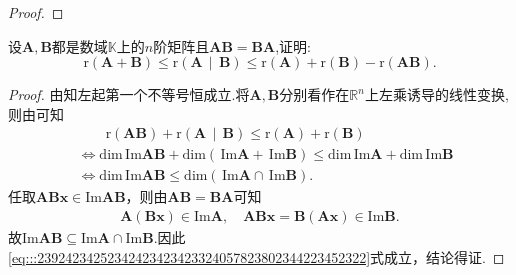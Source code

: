 \documentclass[../../main.tex]{subfiles}%
\begin{document}
\begin{proof}
\end{proof}

\begin{proposition}\label{proposition:矩阵乘法可交换诱导的秩不等式}
设\(\boldsymbol{A},\boldsymbol{B}\)都是数域\(\mathbb{K}\)上的\(n\)阶矩阵且\(\boldsymbol{A}\boldsymbol{B}=\boldsymbol{B}\boldsymbol{A}\),证明:
\[
\mathrm{r}\left( \boldsymbol{A}+\boldsymbol{B} \right) \leqslant \mathrm{r}\left( \boldsymbol{A}\,\mid \,\boldsymbol{B} \right) \leqslant \mathrm{r}\left( \boldsymbol{A} \right) +\mathrm{r}\left( \boldsymbol{B} \right) -\mathrm{r}\left( \boldsymbol{AB} \right) .
\]
\end{proposition}
\begin{proof}

由知左起第一个不等号恒成立.将$\boldsymbol{A},\boldsymbol{B}$分别看作在$\mathbb{R} ^n$上左乘诱导的线性变换,则由可知
\begin{align}
&\quad \quad \mathrm{r}\left( \boldsymbol{AB} \right) +\mathrm{r}\left( \boldsymbol{A}\,\mid \,\boldsymbol{B} \right) \leqslant \mathrm{r}\left( \boldsymbol{A} \right) +\mathrm{r}\left( \boldsymbol{B} \right) 
\nonumber \\
&\Longleftrightarrow \mathrm{dim}\,\mathrm{Im}\boldsymbol{AB}+\mathrm{dim}\left( \,\mathrm{Im}\boldsymbol{A}+\,\mathrm{Im}\boldsymbol{B} \right) \leqslant \mathrm{dim}\,\mathrm{Im}\boldsymbol{A}+\mathrm{dim}\,\mathrm{Im}\boldsymbol{B}
\nonumber \\
&\Longleftrightarrow \mathrm{dim}\,\mathrm{Im}\boldsymbol{AB}\leqslant \mathrm{dim}\left( \,\mathrm{Im}\boldsymbol{A}\cap \,\mathrm{Im}\boldsymbol{B} \right) .\label{eq:::23924234252342423423423324057823802344223452322}
\end{align}
任取$\boldsymbol{ABx}\in \mathrm{Im}\boldsymbol{AB}$，则由$\boldsymbol{AB}=\boldsymbol{BA}$可知
\begin{align*}
\boldsymbol{A}\left( \boldsymbol{Bx} \right) \in \mathrm{Im}\boldsymbol{A},\quad \boldsymbol{ABx}=\boldsymbol{B}\left( \boldsymbol{Ax} \right) \in \mathrm{Im}\boldsymbol{B}.
\end{align*}
故$\mathrm{Im}\boldsymbol{AB}\subseteq \mathrm{Im}\boldsymbol{A}\cap \mathrm{Im}\boldsymbol{B}$.因此\eqref{eq:::23924234252342423423423324057823802344223452322}式成立，结论得证.

\end{proof}
\end{document}
